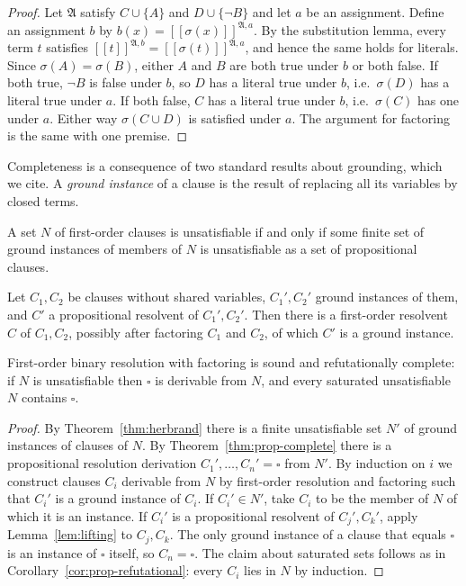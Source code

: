 \begin{proof}
Let $\mathfrak{A}$ satisfy $C\cup\{A\}$ and $D\cup\{\neg B\}$ and let $a$ be an assignment. Define an assignment $b$ by $b(x)=[\![\sigma(x)]\!]^{\mathfrak{A},a}$. By the substitution lemma, every term $t$ satisfies $[\![t]\!]^{\mathfrak{A},b}=[\![\sigma(t)]\!]^{\mathfrak{A},a}$, and hence the same holds for literals. Since $\sigma(A)=\sigma(B)$, either $A$ and $B$ are both true under $b$ or both false. If both true, $\neg B$ is false under $b$, so $D$ has a literal true under $b$, i.e.\ $\sigma(D)$ has a literal true under $a$. If both false, $C$ has a literal true under $b$, i.e.\ $\sigma(C)$ has one under $a$. Either way $\sigma(C\cup D)$ is satisfied under $a$. The argument for factoring is the same with one premise.
\end{proof}

Completeness is a consequence of two standard results about grounding, which we cite. A \emph{ground instance} of a clause is the result of replacing all its variables by closed terms.

\begin{theorem}[Herbrand]
\label{thm:herbrand}
 A set $N$ of first-order clauses is unsatisfiable if and only if some finite set of ground instances of members of $N$ is unsatisfiable as a set of propositional clauses.
\end{theorem}

\begin{lemma}[Lifting]
\label{lem:lifting}
 Let $C_1,C_2$ be clauses without shared variables, $C_1',C_2'$ ground instances of them, and $C'$ a propositional resolvent of $C_1',C_2'$. Then there is a first-order resolvent $C$ of $C_1,C_2$, possibly after factoring $C_1$ and $C_2$, of which $C'$ is a ground instance.
\end{lemma}

\begin{theorem}
\label{thm:fo-complete}
First-order binary resolution with factoring is sound and refutationally complete: if $N$ is unsatisfiable then $\square$ is derivable from $N$, and every saturated unsatisfiable $N$ contains $\square$.
\end{theorem}

\begin{proof}
By Theorem~\ref{thm:herbrand} there is a finite unsatisfiable set $N'$ of ground instances of clauses of $N$. By Theorem~\ref{thm:prop-complete} there is a propositional resolution derivation $C_1',\dots,C_n'=\square$ from $N'$. By induction on $i$ we construct clauses $C_i$ derivable from $N$ by first-order resolution and factoring such that $C_i'$ is a ground instance of $C_i$. If $C_i'\in N'$, take $C_i$ to be the member of $N$ of which it is an instance. If $C_i'$ is a propositional resolvent of $C_j',C_k'$, apply Lemma~\ref{lem:lifting} to $C_j,C_k$. The only ground instance of a clause that equals $\square$ is an instance of $\square$ itself, so $C_n=\square$. The claim about saturated sets follows as in Corollary~\ref{cor:prop-refutational}: every $C_i$ lies in $N$ by induction.
\end{proof}

